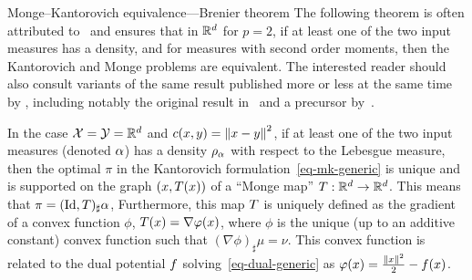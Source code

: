 \begin{rem2}{Monge--Kantorovich equivalence---Brenier theorem}\label{rem-exist-mongemap}
The following theorem is often attributed to~\citet{Brenier91} and ensures that in $\mathbb{R}^d$ for $p=2$, if at least one of the two input measures has a density, and for measures with second order moments, then the Kantorovich and Monge problems are equivalent. The interested reader should also consult variants of the same result published more or less at the same time by \citet{cuesta1989,ruschendorf1990characterization}, including notably the original result in~\citep{MR923203} and a precursor by~\citet{knott1984optimal}.

\begin{thm}[Brenier]
	In the case $\mathcal{X}=\mathcal{Y}=\mathbb{R}^d$ and $c(x,y)=\left\| x-y \right\|^2$, if at least one of the two input measures (denoted $\alpha$) has a density $\rho_{\alpha}$ with respect to the Lebesgue measure, then the optimal $\pi$ in the Kantorovich formulation~\eqref{eq-mk-generic} is unique and is supported on the graph $(x,T(x))$ of a ``Monge map'' $T : \mathbb{R}^d \rightarrow \mathbb{R}^d$. This means that $\pi = (\mathrm{Id},T)_{\sharp} \alpha$, \ie
{}
Furthermore, this map $T$ is uniquely defined as the gradient of a convex function $\phi$, $T(x) = \nabla\varphi(x)$, where $\phi$ is the unique (up to an additive constant) convex function such that $(\nabla\phi)_\sharp \mu=\nu$. This convex function is related to the dual potential $f$ solving~\eqref{eq-dual-generic} as $\varphi(x)=\frac{\left\| x \right\|^2}{2}-f(x)$.
\end{thm}


\end{rem2}
